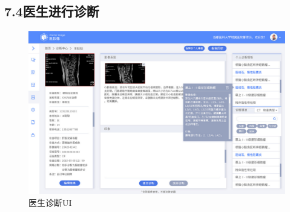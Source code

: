 \documentclass[24pt,a4paper]{article}%
\begin{document}
\subsection*{\songti 7.4医生进行诊断}
\begin{figure}[H]
	\centering
	\includegraphics[width=1\textwidth]{./image/wenzhen-3.png}
	\caption*{医生诊断UI}
\end{figure}

%
%

\newpage
\end{document}
